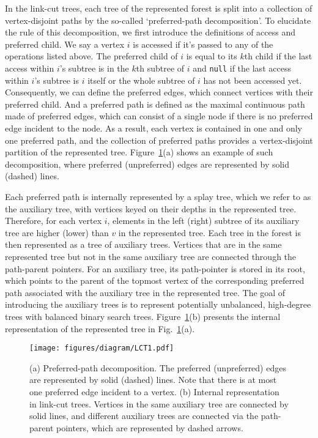 In the link-cut trees, each tree of the represented forest is split into a collection of vertex-disjoint paths by the so-called `preferred-path decomposition'.
To elucidate the rule of this decomposition, we first introduce the definitions of access and preferred child. We say a vertex $i$ is
accessed if it's passed to any of the operations listed above. The preferred child of $i$ is equal to
its $k$th child if the last access within $i$'s subtree is in the $k$th subtree of $i$ and \texttt{null} if the last access within $i$'s
subtree is $i$ itself or the whole subtree of $i$ has not been accessed yet. Consequently, we can define the preferred edges,
which connect vertices with their preferred child. And a preferred path is defined as the maximal continuous path made of preferred edges, 
which can consist of a single node if there is no preferred edge incident to the node. As a result, each vertex is
contained in one and only one preferred path, and the collection of preferred paths provides a vertex-disjoint partition of the represented tree.
Figure~\ref{fig:LCT_repr}(a) shows an example of such decomposition, where preferred (unpreferred) edges are represented by solid (dashed) lines.

Each preferred path is internally represented by a splay tree, which we refer to as the auxiliary tree, with vertices keyed on their depths in the represented tree. Therefore, for each vertex $i$, elements in the left (right) subtree of its auxiliary tree are higher (lower) than $v$ in the represented tree.
Each tree in the forest is then represented as a tree of auxiliary trees. Vertices that are in the same represented tree but not in the same auxiliary tree are connected through the path-parent pointers. 
For an auxiliary tree, its path-pointer is stored in its root, which points to the parent of the topmost vertex of the corresponding preferred
path associated with the auxiliary tree in the represented tree. The goal of introducing the auxiliary trees is to represent 
potentially unbalanced, high-degree trees with balanced binary search trees. Figure~\ref{fig:LCT_repr}(b) presents the internal representation
of the represented tree in Fig.~\ref{fig:LCT_repr}(a).
\begin{figure}[tb]
  \centering
  \vspace{5ex}
  \texttt{[image: figures/diagram/LCT1.pdf]}
  \vspace{3ex}
  \caption{(a) Preferred-path decomposition. The preferred (unpreferred) edges are represented by solid (dashed) lines. Note that there is
  at most one preferred edge incident to a vertex. (b) Internal representation in link-cut trees. Vertices in the same auxiliary tree are connected by solid lines, and different auxiliary trees are connected via the path-parent pointers, which are represented by
  dashed arrows.}
  \label{fig:LCT_repr}
\end{figure}

